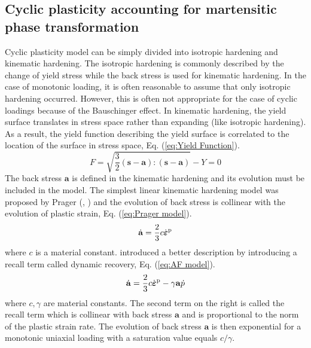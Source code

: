 \documentclass[preprint,5p,twocolumn,10pt,sort&compress]{elsarticle}
\newcommand{\bfepsilon}{{\mbox{\boldmath{$\varepsilon$}}}}
\begin{document}
\subsection{Cyclic plasticity accounting for martensitic phase transformation}

Cyclic plasticity model can be simply divided into isotropic hardening and kinematic hardening. The isotropic hardening is commonly described by the change of yield stress while the back stress is used for kinematic hardening. In the case of monotonic loading, it is often reasonable to assume that only isotropic hardening occurred. However, this is often not appropriate for the case of cyclic loadings because of the Bauschinger effect. In kinematic hardening, the yield surface translates in stress space rather than expanding (like isotropic hardening). As a result, the yield function describing the yield surface is correlated to the location of the surface in stress space, Eq.  (\ref{eq:Yield Function}).
\begin{equation}\label{eq:Yield Function}
F=\sqrt{\frac{3}{2}\left ( \mathbf{s}-\mathbf{a} \right ):\left ( \mathbf{s}-\mathbf{a} \right )}-Y=0
\end{equation}
The back stress $\mathbf{a}$ is defined in the kinematic hardening and its evolution must be included in the model. The simplest linear kinematic hardening model was proposed by Prager (\citeauthor{Prager}, \citeyear{Prager}) and the evolution of back stress is collinear with the evolution of plastic strain, Eq. (\ref{eq:Prager model}).
\begin{equation}\label{eq:Prager model}
\dot{\mathbf{a}}=\frac{2}{3}c\dot{\bfepsilon}^{\rm p}
\end{equation}
where $c$ is a material constant. \cite{Frederick2007A} introduced a better description by introducing a recall term called dynamic recovery, Eq. (\ref{eq:AF model}).
\begin{equation}\label{eq:AF model}
\dot{\mathbf{a}}=\frac{2}{3} c \dot{\bfepsilon}^{\rm p}-\gamma \mathbf{a} \dot{p}
\end{equation}
where $c, \gamma$ are material constants. The second term on the right is called the recall term which is collinear with back stress $\mathbf{a}$ and is proportional to the norm of the plastic strain rate. The evolution of back stress $\mathbf{a}$ is then exponential for a monotonic uniaxial loading with a saturation value equals $c/ \gamma$.
\end{document}
